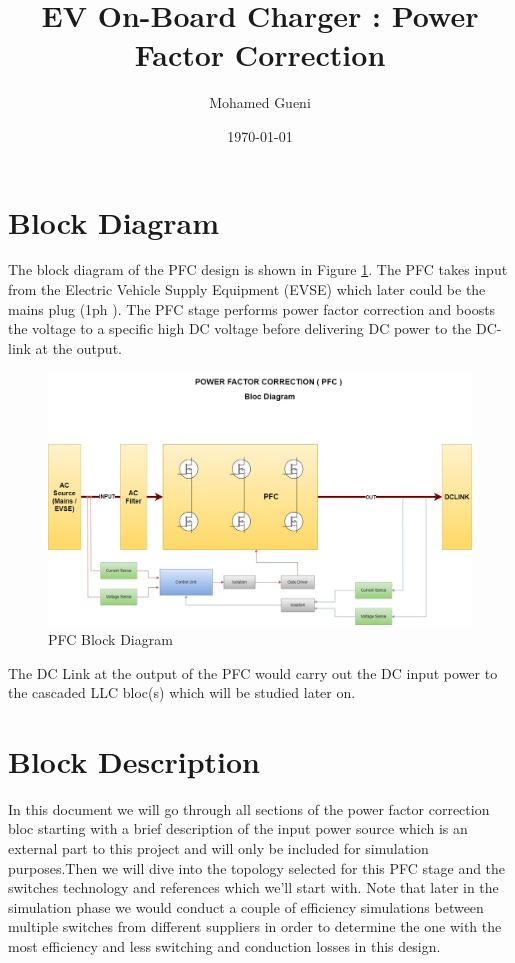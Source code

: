 \documentclass{article}
\begin{document}
\title{EV On-Board Charger : Power Factor Correction}
\author{Mohamed Gueni}
\date{\today}
\maketitle
\tableofcontents
\section{Block Diagram}

The block diagram of the PFC design is shown in Figure \ref{fig:PFC}. The PFC takes input from the Electric Vehicle Supply Equipment (EVSE) which later could be the mains plug (1ph ).
The PFC stage performs power factor correction and boosts the voltage to a specific high DC voltage before delivering DC power to the DC-link at the output.

\begin{figure}[htbp]
    \centering
    \includegraphics[width=\textwidth]{PFC.jpg}
    \caption{PFC Block Diagram}
    \label{fig:PFC}
\end{figure}
The DC Link at the output of the PFC would carry out the DC input power to the cascaded LLC bloc(s) which will be studied later on.
\section{Block Description}
In this document we will go through all sections of the power factor correction bloc starting with a brief description of the input power source which is an external part to this project and will only be included for simulation purposes.Then we will dive into the topology selected for this PFC stage and the switches technology and references which we'll start with.
Note that later in the simulation phase we would conduct a couple of efficiency simulations between multiple switches from different suppliers in order to determine the one with the most efficiency and less switching and conduction losses in this design.
\end{document}
